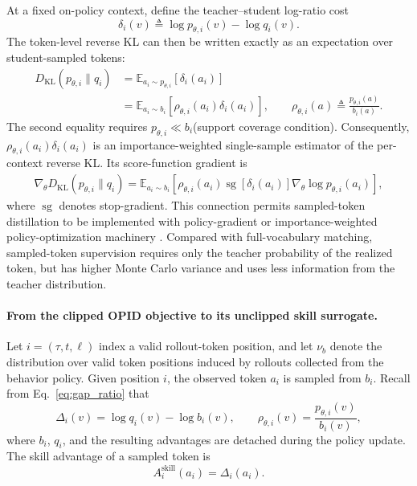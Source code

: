 \documentclass{llmxive}
\begin{document}
At a fixed on-policy context, define the teacher--student log-ratio cost
\begin{equation*}
 \delta_i(v)
 \triangleq
 \log p_{\theta,i}(v)-\log q_i(v).
\end{equation*}
The token-level reverse KL can then be written exactly as an expectation over
student-sampled tokens:
\begin{equation*}
\begin{aligned}
 D_{\mathrm{KL}}(p_{\theta,i}\|q_i)
 &=
 \mathbb E_{a_i\sim p_{\theta,i}}
 \left[
 \delta_i(a_i)
 \right]\\
 &=
 \mathbb E_{a_i\sim b_i}
 \left[
 \rho_{\theta,i}(a_i)\delta_i(a_i)
 \right],
 \qquad
 \rho_{\theta,i}(a)
 \triangleq
 \frac{p_{\theta,i}(a)}{b_i(a)}.
\end{aligned}
\end{equation*}
The second equality requires \(p_{\theta,i}\ll b_i\)(support coverage condition). Consequently,
\(\rho_{\theta,i}(a_i)\delta_i(a_i)\) is an importance-weighted
single-sample estimator of the per-context reverse KL. Its score-function
gradient is
\begin{equation*}
\begin{aligned}
 \nabla_\theta
 D_{\mathrm{KL}}(p_{\theta,i}\|q_i)
 =
 \mathbb E_{a_i\sim b_i}
 \left[
 \rho_{\theta,i}(a_i)
 \operatorname{sg}\!\left[\delta_i(a_i)\right]
 \nabla_\theta\log p_{\theta,i}(a_i)
 \right],
\end{aligned}
\end{equation*}
where \(\operatorname{sg}\) denotes stop-gradient. This connection permits
sampled-token distillation to be implemented with policy-gradient or
importance-weighted policy-optimization machinery
\citep{gu2024minillm,lu2025onpolicydistillation,oh2026kl}.
Compared with full-vocabulary matching, sampled-token supervision requires
only the teacher probability of the realized token, but has higher
Monte Carlo variance and uses less information from the teacher distribution.


\paragraph{From the clipped OPID objective to its unclipped skill
surrogate.}
Let \(i=(\tau,t,\ell)\) index a valid rollout-token position, and let
\(\nu_b\) denote the distribution over valid token positions induced by
rollouts collected from the behavior policy. Given position \(i\), the
observed token \(a_i\) is sampled from \(b_i\). Recall from
Eq.~\ref{eq:gap_ratio} that
\[
 \Delta_i(v)
 =
 \log q_i(v)-\log b_i(v),
 \qquad
 \rho_{\theta,i}(v)
 =
 \frac{p_{\theta,i}(v)}{b_i(v)},
\]
where \(b_i\), \(q_i\), and the resulting advantages are detached during
the policy update. The skill advantage of a sampled token is
\begin{equation*}
 A_i^{\mathrm{skill}}(a_i)
 =
 \Delta_i(a_i).
\end{equation*}
\end{document}

